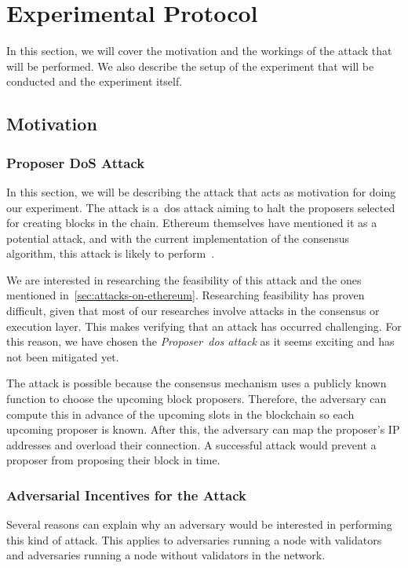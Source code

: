

\section{Experimental Protocol}\label{sec:experimental-protocol}
In this section, we will cover the motivation and the workings of the attack that will be performed.
We also describe the setup of the experiment that will be conducted and the experiment itself.

\subsection{Motivation}\label{subsec:proposer-dos-attack}
\subsubsection{Proposer DoS Attack}
In this section, we will be describing the attack that acts as motivation for doing our experiment.
The attack is a~\gls{dos} attack aiming to halt the proposers selected for creating blocks in the chain.
Ethereum themselves have mentioned it as a potential attack, and with the current implementation of the consensus algorithm, this attack is likely to perform~\cite{EthereumSSLE2024,EthereumAttackDefense2024}.

We are interested in researching the feasibility of this attack and the ones mentioned in~\autoref{sec:attacks-on-ethereum}.
Researching feasibility has proven difficult, given that most of our researches involve attacks in the consensus or execution layer.
This makes verifying that an attack has occurred challenging.
For this reason, we have chosen the \textit{Proposer~\gls{dos} attack} as it seems exciting and has not been mitigated yet.

The attack is possible because the consensus mechanism uses a publicly known function to choose the upcoming block proposers.
Therefore, the adversary can compute this in advance of the upcoming slots in the blockchain so each upcoming proposer is known.
After this, the adversary can map the proposer's IP addresses and overload their connection.
A successful attack would prevent a proposer from proposing their block in time.

\subsubsection{Adversarial Incentives for the Attack}

Several reasons can explain why an adversary would be interested in performing this kind of attack.
This applies to adversaries running a node with validators and adversaries running a node without validators in the network.


